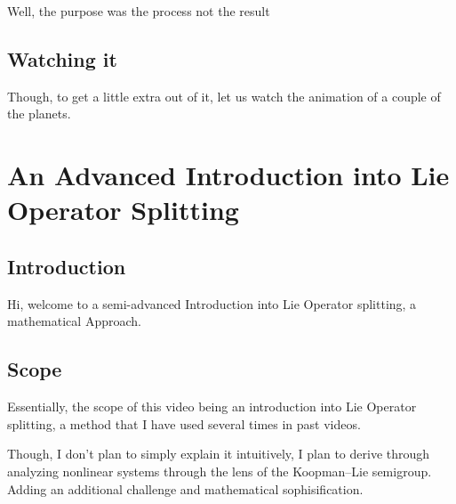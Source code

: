 Well, the purpose was the process not the result

\subsection{Watching it}
Though, to get a little extra out of it, let us watch the animation of a couple of the planets.


\section{An Advanced Introduction into Lie Operator Splitting}

\subsection{Introduction}

Hi, welcome to a semi-advanced Introduction into Lie Operator splitting, a mathematical Approach.


\subsection{Scope}

Essentially, the scope of this video being an introduction into Lie Operator splitting, a method that I have used several times in past videos.

Though, I don't plan to simply explain it intuitively, I plan to derive through analyzing nonlinear systems through the lens of the Koopman–Lie semigroup. Adding an additional challenge and mathematical sophisification.
